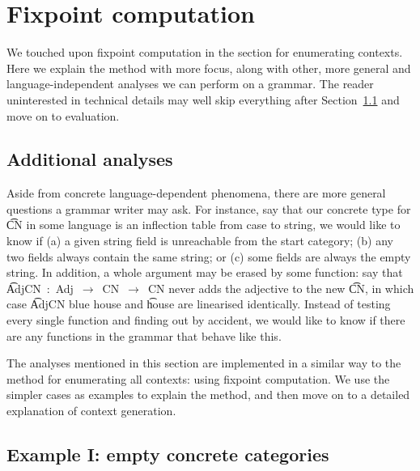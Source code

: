 \section{Fixpoint computation}
\label{sec:moreFP}

We touched upon fixpoint computation in the section for enumerating
contexts. Here we explain the method with more focus, along with
other, more general and language-independent analyses we can perform
on a grammar. The reader uninterested in technical details may well
skip everything 
after Section~\ref{additional-analyses} and move on to
evaluation.

\subsection{Additional analyses}
\label{additional-analyses}

Aside from concrete language-dependent phenomena, there are more
general questions a grammar writer may ask. For instance, say that our
concrete type for \t{CN} in some language is an inflection table from
case to string, we would like to know if (a) a given string field is
unreachable from the start category; (b) any two fields always contain
the same string; or (c) some fields are always the empty string.  In
addition, a whole argument may be erased by some function: say that
\t{AdjCN~:~Adj~$\rightarrow$~CN~$\rightarrow$~CN} never adds the
adjective to the new \t{CN}, in which case \t{AdjCN blue house} and
\t{house} are linearised identically. Instead of testing every single
function and finding out by accident, we would like to know if there
are any functions in the grammar that behave like this.


The analyses mentioned in this section are implemented in a similar
way to the method for enumerating all contexts: using fixpoint
computation. We use the simpler cases as examples to explain the
method, and then move on to a detailed explanation of context
generation.

\subsection{Example I: empty concrete categories}

